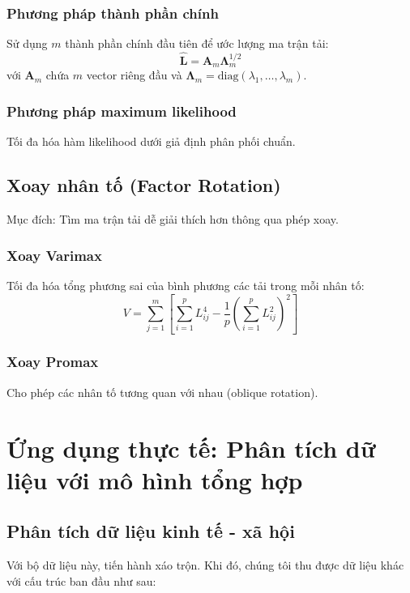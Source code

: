 \subsubsection*{Phương pháp thành phần chính}
Sử dụng $m$ thành phần chính đầu tiên để ước lượng ma trận tải:
\[
\hat{\mathbf{L}} = \mathbf{A}_m\boldsymbol{\Lambda}_m^{1/2}
\]
với $\mathbf{A}_m$ chứa $m$ vector riêng đầu và $\boldsymbol{\Lambda}_m = \text{diag}(\lambda_1, \ldots, \lambda_m)$.

\subsubsection*{Phương pháp maximum likelihood}
Tối đa hóa hàm likelihood dưới giả định phân phối chuẩn.

\subsection{Xoay nhân tố (Factor Rotation)}
Mục đích: Tìm ma trận tải dễ giải thích hơn thông qua phép xoay.

\subsubsection*{Xoay Varimax}
Tối đa hóa tổng phương sai của bình phương các tải trong mỗi nhân tố:
\[
V = \sum_{j=1}^m \left[\sum_{i=1}^p L_{ij}^4 - \frac{1}{p}\left(\sum_{i=1}^p L_{ij}^2\right)^2\right]
\]

\subsubsection*{Xoay Promax}
Cho phép các nhân tố tương quan với nhau (oblique rotation).







\section{Ứng dụng thực tế: Phân tích dữ liệu với mô hình tổng hợp}

\subsection{Phân tích dữ liệu kinh tế - xã hội}

Với bộ dữ liệu này, tiến hành xáo trộn. Khi đó, chúng tôi thu được dữ liệu khác với cấu trúc ban đầu như sau:

